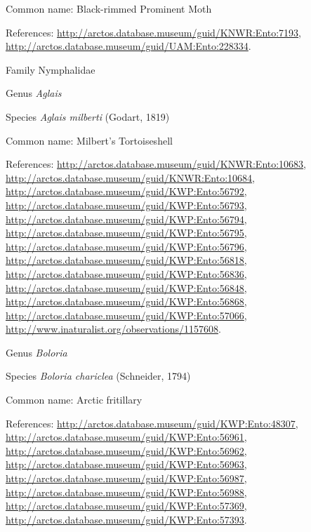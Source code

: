 \documentclass[9pt, article]{memoir}
\begin{document}
\begin{multicols}{2}
Common name: Black-rimmed Prominent Moth

References: 
\url{http://arctos.database.museum/guid/KNWR:Ento:7193}, 
\url{http://arctos.database.museum/guid/UAM:Ento:228334}.

\vspace{6pt}\noindent\hspace{24pt}Family Nymphalidae


\vspace{6pt}\noindent\hspace{30pt}Genus \textit{Aglais}


\vspace{6pt}\noindent\hspace{36pt}Species \textit{Aglais milberti} (Godart, 1819)


Common name: Milbert's Tortoiseshell

References: 
\url{http://arctos.database.museum/guid/KNWR:Ento:10683}, 
\url{http://arctos.database.museum/guid/KNWR:Ento:10684}, 
\url{http://arctos.database.museum/guid/KWP:Ento:56792}, 
\url{http://arctos.database.museum/guid/KWP:Ento:56793}, 
\url{http://arctos.database.museum/guid/KWP:Ento:56794}, 
\url{http://arctos.database.museum/guid/KWP:Ento:56795}, 
\url{http://arctos.database.museum/guid/KWP:Ento:56796}, 
\url{http://arctos.database.museum/guid/KWP:Ento:56818}, 
\url{http://arctos.database.museum/guid/KWP:Ento:56836}, 
\url{http://arctos.database.museum/guid/KWP:Ento:56848}, 
\url{http://arctos.database.museum/guid/KWP:Ento:56868}, 
\url{http://arctos.database.museum/guid/KWP:Ento:57066}, 
\url{http://www.inaturalist.org/observations/1157608}.

\vspace{6pt}\noindent\hspace{30pt}Genus \textit{Boloria}


\vspace{6pt}\noindent\hspace{36pt}Species \textit{Boloria chariclea} (Schneider, 1794)


Common name: Arctic fritillary

References: 
\url{http://arctos.database.museum/guid/KWP:Ento:48307}, 
\url{http://arctos.database.museum/guid/KWP:Ento:56961}, 
\url{http://arctos.database.museum/guid/KWP:Ento:56962}, 
\url{http://arctos.database.museum/guid/KWP:Ento:56963}, 
\url{http://arctos.database.museum/guid/KWP:Ento:56987}, 
\url{http://arctos.database.museum/guid/KWP:Ento:56988}, 
\url{http://arctos.database.museum/guid/KWP:Ento:57369}, 
\url{http://arctos.database.museum/guid/KWP:Ento:57393}.


\end{multicols}
\end{document}
